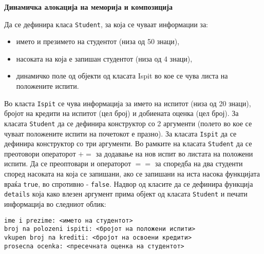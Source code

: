 \documentclass[12pt,a4paper]{exam}
\begin{document}
\pagestyle{headandfoot}
\headrule
{}
\begin{center}
\Large{\textbf{Динамичка алокација на меморија и композиција}}
\end{center}
\begin{questions}

\question
Да се дефинира класа \texttt{Student}, за која се чуваат информации за:
\begin{itemize}
  \item името и презимето на студентот (низа од 50 знаци),
  \item насоката на која е запишан студентот (низа од 4 знаци),
  \item динамичко поле од објекти од класата Ispit во кое се чува листа на
  положените испити.
\end{itemize}
Во класта \texttt{Ispit} се чува информација за името на испитот (низа од 20
знаци), бројот на кредити на испитот (цел број) и добиената оценка (цел број).
За класата \texttt{Student} да се дефинира конструктор со 2 аргументи (полето во
кое се чуваат положените испити на почетокот е празно). За класата
\texttt{Ispit} да се дефинира конструктор со три аргументи. Во рамките на
класата \texttt{Student} да се преотовори операторот $+=$ за додавање на нов
испит во листата на положени испити. Да се преоптовари и операторот $==$ за
споредба на два студенти според насоката на која се запишани, ако се запишани на
иста насока функцијата враќа \texttt{true}, во спротивно - \texttt{false}.
Надвор од класите да се дефинира функција \texttt{details} која како влезен
аргумент прима објект од класата \texttt{Student} и печати информација во
следниот облик: 
\begin{verbatim}
ime i prezime: <името на студентот> 
broj na polozeni ispiti: <бројот на положени испити>
vkupen broj na krediti: <бројот на освоени кредити>
prosecna ocenka: <пресечната оценка на студентот>
\end{verbatim}


\end{questions}
\end{document}
